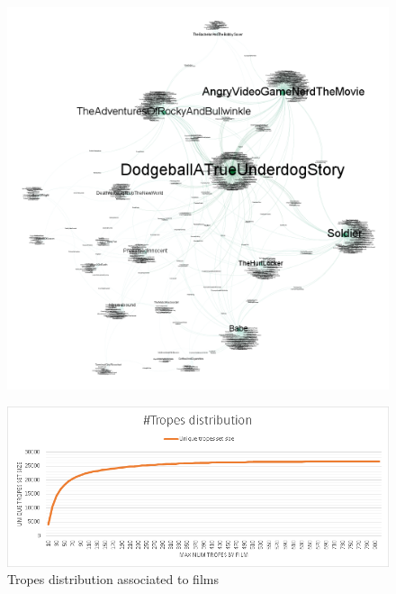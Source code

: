 \documentclass[letterpaper]{article}
\begin{document}
\begin{figure}
	\centering
	\includegraphics[width=0.9\linewidth]{../data/gephi/pairs_films-trope_1k_v3}
	\caption{}
	\label{fig:pairsfilms-trope1kv3}
\end{figure}



\begin{figure}
	\centering
	\includegraphics[width=0.9\linewidth]{../images/tropes_distribution_chart.png}
	\caption{Tropes distribution associated to films}
	\label{fig:tropesdistributionasociatedtofilms}
\end{figure}


\end{document}
